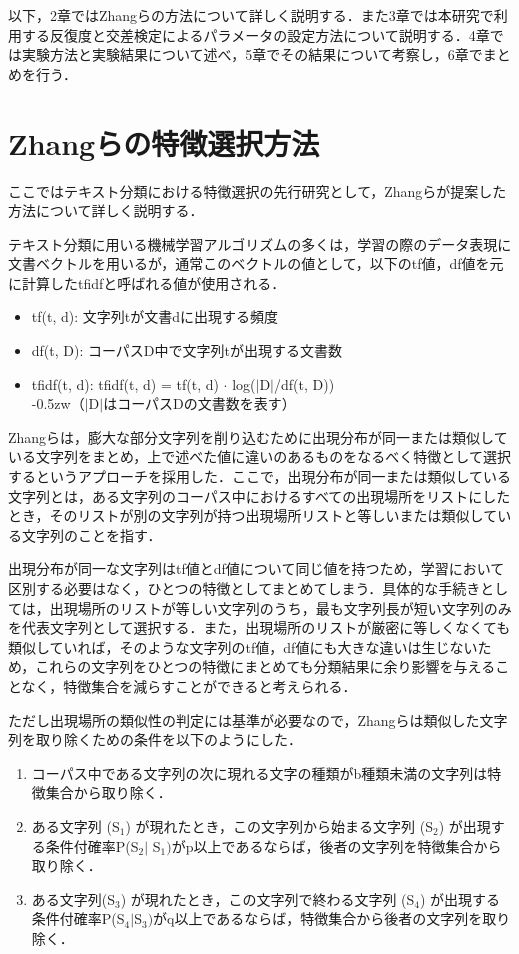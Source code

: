 \documentclass[japanese]{jnlp_1.4}
\begin{document}
以下，2章ではZhangらの方法について詳しく説明する．また3章では本研究で利用する反復度と交差検定によるパラメータの設定方法について説明する．4章では実験方法と実験結果について述べ，5章でその結果について考察し，6章でまとめを行う．


\section{Zhangらの特徴選択方法}

ここではテキスト分類における特徴選択の先行研究として，Zhangらが提案した方法について詳しく説明する．

テキスト分類に用いる機械学習アルゴリズムの多くは，学習の際のデータ表現に文書ベクトルを用いるが，通常このベクトルの値として，以下のtf値，df値を元に計算したtfidfと呼ばれる値が使用される．

\begin{itemize}
\item tf(t, d): 文字列tが文書dに出現する頻度
\item df(t, D): コーパスD中で文字列tが出現する文書数
\item tfidf(t, d): tfidf(t, d) = tf(t, d) $\cdot$ log($\vert $D$\vert $/df(t, D)) \\
{\kern-0.5zw}（$\vert $D$\vert $はコーパスDの文書数を表す）
\end{itemize}

Zhangらは，膨大な部分文字列を削り込むために出現分布が同一または類似している文字列をまとめ，上で述べた値に違いのあるものをなるべく特徴として選択するというアプローチを採用した．ここで，出現分布が同一または類似している文字列とは，ある文字列のコーパス中におけるすべての出現場所をリストにしたとき，そのリストが別の文字列が持つ出現場所リストと等しいまたは類似している文字列のことを指す．

出現分布が同一な文字列はtf値とdf値について同じ値を持つため，学習において区別する必要はなく，ひとつの特徴としてまとめてしまう．具体的な手続きとしては，出現場所のリストが等しい文字列のうち，最も文字列長が短い文字列のみを代表文字列として選択する．また，出現場所のリストが厳密に等しくなくても類似していれば，そのような文字列のtf値，df値にも大きな違いは生じないため，これらの文字列をひとつの特徴にまとめても分類結果に余り影響を与えることなく，特徴集合を減らすことができると考えられる．

ただし出現場所の類似性の判定には基準が必要なので，Zhangらは類似した文字列を取り除くための条件を以下のようにした．

\begin{enumerate}
\item コーパス中である文字列の次に現れる文字の種類がb種類未満の文字列は特徴集合から取り除く．
\item ある文字列 (S$_{1}$) が現れたとき，この文字列から始まる文字列 (S$_{2}$) が出現する条件付確率P(S$_{2}\vert $ S$_{1})$がp以上であるならば，後者の文字列を特徴集合から取り除く．
\item ある文字列(S$_{3}$) が現れたとき，この文字列で終わる文字列 (S$_{4}$) が出現する条件付確率P(S$_{4}\vert $S$_{3})$がq以上であるならば，特徴集合から後者の文字列を取り除く．
\end{enumerate}
\end{document}
